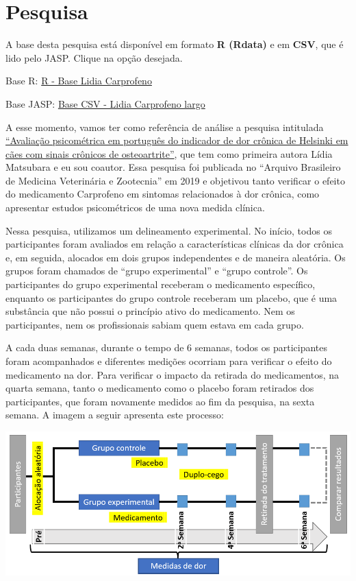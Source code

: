 \documentclass[
]{book}
\begin{document}
\hypertarget{pesquisa-6}{%
\section{Pesquisa}\label{pesquisa-6}}

A base desta pesquisa está disponível em formato \textbf{R (Rdata)} e em \textbf{CSV}, que é lido pelo JASP. Clique na opção desejada.

Base R: \href{https://github.com/anovabr/mqt/raw/master/bases/R\%20-\%20Base\%20Lidia\%20Carprofeno.RData}{R - Base Lidia Carprofeno}

Base JASP: \href{https://github.com/anovabr/mqt/raw/master/bases/bases_csv_jasp.zip}{Base CSV - Lidia Carprofeno largo}

A esse momento, vamos ter como referência de análise a pesquisa intitulada \href{https://www.scielo.br/scielo.php?script=sci_arttext\&pid=S0102-09352019000100109}{``Avaliação psicométrica em português do indicador de dor crônica de Helsinki em cães com sinais crônicos de osteoartrite''}, que tem como primeira autora Lídia Matsubara e eu sou coautor. Essa pesquisa foi publicada no ``Arquivo Brasileiro de Medicina Veterinária e Zootecnia'' em 2019 e objetivou tanto verificar o efeito do medicamento Carprofeno em sintomas relacionados à dor crônica, como apresentar estudos psicométricos de uma nova medida clínica.

Nessa pesquisa, utilizamos um delineamento experimental. No início, todos os participantes foram avaliados em relação a características clínicas da dor crônica e, em seguida, alocados em dois grupos independentes e de maneira aleatória. Os grupos foram chamados de ``grupo experimental'' e ``grupo controle''. Os participantes do grupo experimental receberam o medicamento específico, enquanto os participantes do grupo controle receberam um placebo, que é uma substância que não possui o princípio ativo do medicamento. Nem os participantes, nem os profissionais sabiam quem estava em cada grupo.

A cada duas semanas, durante o tempo de 6 semanas, todos os participantes foram acompanhados e diferentes medições ocorriam para verificar o efeito do medicamento na dor. Para verificar o impacto da retirada do medicamentos, na quarta semana, tanto o medicamento como o placebo foram retirados dos participantes, que foram novamente medidos ao fim da pesquisa, na sexta semana. A imagem a seguir apresenta este processo:

\includegraphics{./img/delineamento_experimental.png}
\end{document}
